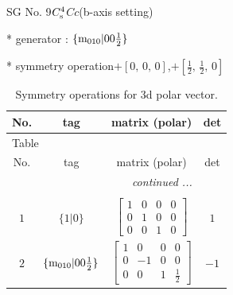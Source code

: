 \documentclass[fleqn,8pt]{jsarticle}
\begin{document}
\setcounter{MaxMatrixCols}{32}

\renewcommand{\tablename}{Table~}
\renewcommand{\figurename}{Figure~}
\begin{center}
\LARGE
SG No. 9\quad$C_{\rm s}^{4}$\quad$Cc$\quad(b-axis setting)\quad[ monoclinic ]
\end{center}

* generator : $\{{\rm m}_{010}|0 0 \frac{1}{2}\}$

* symmetry operation\quad$+\left[ 0,\, 0,\, 0 \right]$,\quad $+\left[ \frac{1}{2},\, \frac{1}{2},\, 0 \right]$
\renewcommand{\arraystretch}{1.3}
\begin{longtable}{cccc}
\caption{Symmetry operations for 3d polar vector.}
 \\
 \hline \hline
No. & tag & matrix (polar) & det \\ \hline \endfirsthead

\multicolumn{3}{l}{\tablename\ \thetable{}} \\
 \hline \hline
No. & tag & matrix (polar) & det \\ \hline \endhead

 \hline \hline
\multicolumn{3}{r}{\footnotesize\it continued ...} \\ \endfoot

 \hline \hline
\multicolumn{3}{r}{} \\ \endlastfoot

$ 1 $ & $ \{1|0\} $ & $ \begin{bmatrix} 1 & 0 & 0 & 0 \\ 0 & 1 & 0 & 0 \\ 0 & 0 & 1 & 0 \end{bmatrix} $ & $ 1 $ \\ \hline
$ 2 $ & $ \{{\rm m}_{010}|0 0 \frac{1}{2}\} $ & $ \begin{bmatrix} 1 & 0 & 0 & 0 \\ 0 & -1 & 0 & 0 \\ 0 & 0 & 1 & \frac{1}{2} \end{bmatrix} $ & $ -1 $ \\
\end{longtable}
\end{document}
